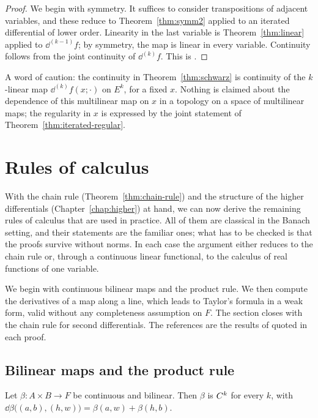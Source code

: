 \begin{proof}
  \leanok
  We begin with symmetry. It suffices to consider transpositions of adjacent variables, and
  these reduce to Theorem~\ref{thm:symm2} applied to an iterated differential of lower order.
  Linearity in the last variable is Theorem~\ref{thm:linear} applied to $\dd^{(k-1)} f$; by
  symmetry, the map is linear in every variable. Continuity follows from the joint continuity
  of $\dd^{(k)} f$. This is \cite[1.3.17]{GN26}.
\end{proof}

\begin{remark}
  A word of caution: the continuity in Theorem~\ref{thm:schwarz} is continuity of the
  $k$-linear map $\dd^{(k)} f(x; \cdot)$ on $E^k$, for a fixed $x$. Nothing is claimed about
  the dependence of this multilinear map on $x$ in a topology on a space of multilinear maps;
  the regularity in $x$ is expressed by the joint statement of
  Theorem~\ref{thm:iterated-regular}.
\end{remark}


\section{Rules of calculus}
\label{sec:rules}

With the chain rule (Theorem~\ref{thm:chain-rule}) and the structure of the higher
differentials (Chapter~\ref{chap:higher}) at hand, we can now derive the remaining rules of
calculus that are used in practice. All of them are classical in the Banach setting, and their
statements are the familiar ones; what has to be checked is that the proofs survive without
norms. In each case the argument either reduces to the chain rule or, through a continuous
linear functional, to the calculus of real functions of one variable.

We begin with continuous bilinear maps and the product rule. We then compute the derivatives
of a map along a line, which leads to Taylor's formula in a weak form, valid without any
completeness assumption on $F$. The section closes with the chain rule for second
differentials. The references are the results of \cite{GN26} quoted in each proof.

\subsection{Bilinear maps and the product rule}

\begin{theorem}
  \label{thm:bilinear}
  \leanok
  Let $\beta \colon A \times B \to F$ be continuous and bilinear. Then $\beta$ is $C^{k}$ for
  every $k$, with $\dd \beta\bigl((a, b), (h, w)\bigr) = \beta(a, w) + \beta(h, b)$.
\end{theorem}

